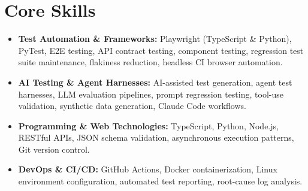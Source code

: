 \documentclass[a4paper,10pt]{article}
\begin{document}
\section{Core Skills}
\begin{itemize}
 \item \textbf{Test Automation \& Frameworks:} Playwright (TypeScript \& Python), PyTest, E2E testing, API contract testing, component testing, regression test suite maintenance, flakiness reduction, headless CI browser automation.
 \item \textbf{AI Testing \& Agent Harnesses:} AI-assisted test generation, agent test harnesses, LLM evaluation pipelines, prompt regression testing, tool-use validation, synthetic data generation, Claude Code workflows.
 \item \textbf{Programming \& Web Technologies:} TypeScript, Python, Node.js, RESTful APIs, JSON schema validation, asynchronous execution patterns, Git version control.
 \item \textbf{DevOps \& CI/CD:} GitHub Actions, Docker containerization, Linux environment configuration, automated test reporting, root-cause log analysis.
\end{itemize}
\end{document}
